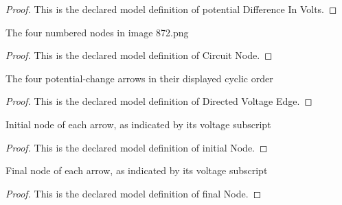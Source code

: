 \begin{proof}
  This is the declared model definition of potential Difference In Volts.
\end{proof}
\begin{definition}
  \label{def:physics:phyx-mini-0872:phyxminiproblems-problemphyxmini0872-circuitnode}
  The four numbered nodes in image 872.png
\end{definition}
\begin{proof}
  This is the declared model definition of Circuit Node.
\end{proof}
\begin{definition}
  \label{def:physics:phyx-mini-0872:phyxminiproblems-problemphyxmini0872-directedvoltageedge}
  The four potential-change arrows in their displayed cyclic order
\end{definition}
\begin{proof}
  This is the declared model definition of Directed Voltage Edge.
\end{proof}
\begin{definition}
  \label{def:physics:phyx-mini-0872:phyxminiproblems-problemphyxmini0872-directedvoltageedge-initialnode}
  Initial node of each arrow, as indicated by its voltage subscript
\end{definition}
\begin{proof}
  This is the declared model definition of initial Node.
\end{proof}
\begin{definition}
  \label{def:physics:phyx-mini-0872:phyxminiproblems-problemphyxmini0872-directedvoltageedge-finalnode}
  Final node of each arrow, as indicated by its voltage subscript
\end{definition}
\begin{proof}
  This is the declared model definition of final Node.
\end{proof}
